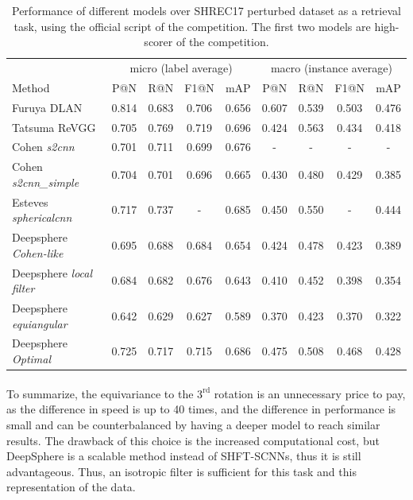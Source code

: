\documentclass[11pt]{report}
\begin{document}
\begin{table}[ht]
    \centering
    \begin{tabular}{l|c c c c|c c c c}
     & \multicolumn{4}{c|}{micro (label average)} & \multicolumn{4}{c}{macro (instance average)} \\
    Method & P@N & R@N & F1@N & mAP & P@N & R@N & F1@N & mAP \\ \hline
    Furuya DLAN & 0.814 & 0.683 & 0.706 & 0.656 & 0.607 & 0.539 & 0.503 & 0.476 \\
    Tatsuma ReVGG & 0.705 & 0.769 & 0.719 & 0.696 & 0.424 & 0.563 & 0.434 & 0.418\\ \hline
    Cohen \emph{s2cnn} & 0.701 & 0.711 & 0.699 & 0.676 & - & - & - & - \\
    Cohen \emph{s2cnn\_simple} & 0.704 & 0.701 & 0.696 & 0.665 & 0.430 & 0.480 & 0.429 & 0.385\\
    Esteves \emph{sphericalcnn} & 0.717 & 0.737 & - & 0.685 & 0.450 & 0.550 & - & 0.444\\ \hline
    Deepsphere \emph{Cohen-like} & 0.695 & 0.688 & 0.684 & 0.654 & 0.424 & 0.478 & 0.423 & 0.389\\
    Deepsphere \emph{local filter} & 0.684 & 0.682 & 0.676 & 0.643 & 0.410 & 0.452 & 0.398 & 0.354 \\
    Deepsphere \emph{equiangular} & 0.642 & 0.629 & 0.627 & 0.589 & 0.370 & 0.423 & 0.370 & 0.322 \\
    Deepsphere \emph{Optimal} & 0.725 & 0.717 & 0.715 & 0.686 & 0.475 & 0.508 & 0.468 & 0.428
    \end{tabular}
    \caption{Performance of different models over SHREC17 perturbed dataset as a retrieval task, using the official script of the competition. The first two models are high-scorer of the competition.}
    \label{tab:SHREC17_retriev}
\end{table}

\paragraph*{}
To summarize, the equivariance to the $3^{\textrm{rd}}$ rotation is an unnecessary price to pay, as the difference in speed is up to 40 times, and the difference in performance is small and can be counterbalanced by having a deeper model to reach similar results. The drawback of this choice is the increased computational cost, but DeepSphere is a scalable method instead of SHFT-SCNNs, thus it is still advantageous. Thus, an isotropic filter is sufficient for this task and this representation of the data.
\end{document}
